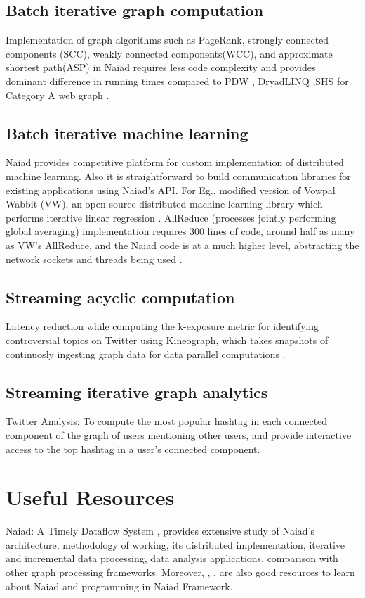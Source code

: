 \documentclass[9pt,twocolumn,twoside]{../../styles/osajnl}
\begin{document}
\subsection{Batch iterative graph computation}
Implementation of graph algorithms such as PageRank, strongly
connected components (SCC), weakly connected components(WCC), and
approximate shortest path(ASP) in Naiad requires less code complexity
and provides dominant difference in running times compared to PDW
\cite{www-PDW}, DryadLINQ \cite{paper-DryadLINQ},SHS \cite{paper-SHS}
for Category A web graph
\cite{dataset-clueweb09,paper1-Naiad,paper-Largegraphs}.
\subsection{Batch iterative machine learning} Naiad provides competitive platform for custom implementation of distributed machine learning. Also it is straightforward to build communication libraries for existing applications using Naiad’s API. For Eg., modified version of Vowpal Wabbit (VW), an open-source distributed machine learning library which performs iterative linear regression \cite{github-vowpalwabbit}. AllReduce (processes jointly performing global averaging) implementation requires 300 lines of code, around half as many as VW’s AllReduce, and the Naiad code is at a much higher level, abstracting the network sockets and threads being used \cite{paper1-Naiad}.
\subsection{Streaming acyclic computation}
Latency reduction while computing the k-exposure metric for
identifying controversial topics on Twitter using Kineograph, which
takes snapshots of continuosly ingesting graph data for data parallel
computations \cite{paper-Kineograph}.
\subsection{Streaming iterative graph analytics}
Twitter Analysis: To compute the most popular hashtag in each
connected component of the graph of users mentioning other users, and
provide interactive access to the top hashtag in a user’s connected
component.

\section{Useful Resources}
Naiad: A Timely Dataflow System \cite{paper1-Naiad}, provides
extensive study of Naiad's architecture, methodology of working, its
distributed implementation, iterative and incremental data processing,
data analysis applications, comparison with other graph processing
frameworks. Moreover, \cite{github-Naiad}, \cite{www-Nuget},
\cite{paper2-Naiad} are also good resources to learn about Naiad and
programming in Naiad Framework.
\end{document}
